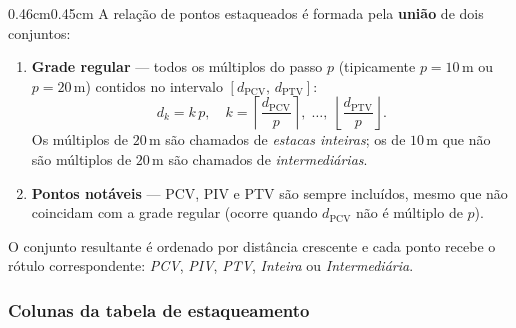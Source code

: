 \documentclass[12pt,letterpaper]{article}
\newenvironment{corpo}{\begin{adjustwidth}{0.46cm}{0.45cm}\justifying}{\end{adjustwidth}}
\begin{document}
\begin{corpo}
A relação de pontos estaqueados é formada pela \textbf{união} de dois conjuntos:

\begin{enumerate}[leftmargin=1.5em]
  \item \textbf{Grade regular} — todos os múltiplos do passo $p$ (tipicamente $p = 10\,\text{m}$ ou $p = 20\,\text{m}$) contidos no intervalo $[d_{\mathrm{PCV}},\, d_{\mathrm{PTV}}]$:
  \[
   d_k = k\,p, \quad k = \left\lceil \frac{d_{\mathrm{PCV}}}{p} \right\rceil,\;\ldots,\; \left\lfloor \frac{d_{\mathrm{PTV}}}{p} \right\rfloor.
  \]
  Os múltiplos de $20\,\text{m}$ são chamados de \emph{estacas inteiras}; os de $10\,\text{m}$ que não são múltiplos de $20\,\text{m}$ são chamados de \emph{intermediárias}.

  \item \textbf{Pontos notáveis} --- PCV, PIV e PTV são sempre incluídos, mesmo que não coincidam com a grade regular (ocorre quando $d_{\mathrm{PCV}}$ não é múltiplo de $p$).
\end{enumerate}

O conjunto resultante é ordenado por distância crescente e cada ponto recebe o rótulo correspondente: \textit{PCV}, \textit{PIV}, \textit{PTV}, \textit{Inteira} ou \textit{Intermediária}.
\end{corpo}

\subsubsection*{Colunas da tabela de estaqueamento}
\end{document}
